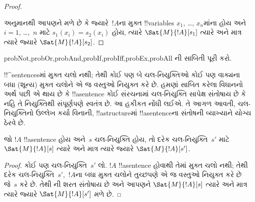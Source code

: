 \documentclass[../../../include/open-logic-section]{subfiles}
\begin{document}
\begin{proof}
\begin{enumerate}
\end{enumerate}
અનુમાનથી આપણને મળે છે કે જ્યારે~$!A$ના મુક્ત !!{variable}s
$x_1$, \dots, $x_n$માંના હોય અને $i=1$, \dots,~$n$ માટે
$s_1(x_i)=s_2(x_i)$ હોય, ત્યારે $\Sat{M}{!A}[s_1]$ ત્યારે અને માત્ર
ત્યારે જ્યારે $\Sat{M}{!A}[s_2]$.
\end{proof}

\begin{probtag}{probNot,probOr,probAnd,probIf,probIff,probEx,probAll}
ની સાબિતી પૂરી કરો.
\end{probtag}

\begin{explain}
!!^{sentence}sમાં મુક્ત ચલો નથી; તેથી કોઈ પણ બે ચલ-નિયુક્તિઓ કોઈ પણ
વાક્યના બધા (શૂન્ય) મુક્ત ચલોને એ જ વસ્તુઓ નિયુક્ત કરે છે. હમણાં
સાબિત કરેલા વિધાનનો અર્થ પછી એ થાય છે કે !!a{sentence} કોઈ સંરચનામાં
ચલ-નિયુક્તિ સાપેક્ષ સંતોષાય છે કે નહિ તે નિયુક્તિથી સંપૂર્ણપણે
સ્વતંત્ર છે. આ હકીકત નોંધી લઈએ. તે આગળ આવતી, ચલ-નિયુક્તિનો ઉલ્લેખ
કર્યા વિનાની, !!a{structure}માં !!a{sentence}ના સંતોષની વ્યાખ્યાને
યોગ્ય ઠેરવે છે.
\end{explain}

\begin{cor}
જો $!A$ !!a{sentence} હોય અને~$s$ ચલ-નિયુક્તિ હોય, તો દરેક
ચલ-નિયુક્તિ~$s'$ માટે $\Sat{M}{!A}[s]$ ત્યારે અને માત્ર ત્યારે જ્યારે
$\Sat{M}{!A}[s']$.
\end{cor}

\begin{proof}
  કોઈ પણ ચલ-નિયુક્તિ~$s'$ લો. $!A$ !!a{sentence} હોવાથી તેમાં મુક્ત
  ચલો નથી; તેથી દરેક ચલ-નિયુક્તિ~$s'$,~$!A$ના બધા મુક્ત ચલોને
  તુચ્છપણે એ જ વસ્તુઓ નિયુક્ત કરે છે જે~$s$ કરે છે. તેથી
  ની શરત સંતોષાય છે અને આપણને
  $\Sat{M}{!A}[s]$ ત્યારે અને માત્ર ત્યારે જ્યારે
  $\Sat{M}{!A}[s']$ મળે છે.
\end{proof}
\end{document}
